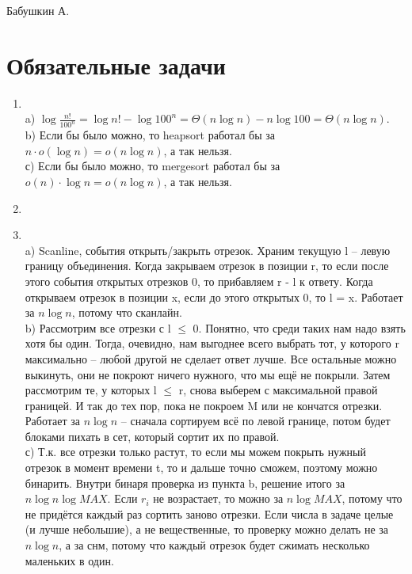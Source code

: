 \documentclass[12pt]{article}
\begin{document}
Бабушкин А.

\section{Обязательные задачи}

\begin{enumerate}
	\setlength{\parskip}{0pt} 
	\setlength{\itemsep}{0pt} 
	\item ~\\
	a) $\log{\frac{n!}{100^n}} = \log{n!} - \log{100^n} = \Theta(n\log n)  - n\log 100 = \Theta(n\log n)$. \\
	b) Если бы было можно, то heapsort работал бы за $n\cdot o(\log n) = o(n\log n)$, а так нельзя. \\
	с) Если бы было можно, то mergesort работал бы за $o(n)\cdot\log n = o(n\log n)$, а так нельзя. \\
	\item ~\\
	\item ~\\
	a) Scanline, события открыть/закрыть отрезок. Храним текущую l -- левую границу объединения. Когда закрываем отрезок в позиции r, то если после этого события открытых отрезков 0, то прибавляем r - l к ответу. Когда открываем отрезок в позиции x, если до этого открытых 0, то l = x. Работает за $n\log n$, потому что сканлайн.\\
	b) Рассмотрим все отрезки с l $\le$ 0. Понятно, что среди таких нам надо взять хотя бы один. Тогда, очевидно, нам выгоднее всего выбрать тот, у которого r максимально -- любой другой не сделает ответ лучше. Все остальные можно выкинуть, они не покроют ничего нужного, что мы ещё не покрыли. Затем рассмотрим те, у которых l $\le$ r, снова выберем с максимальной правой границей. И так до тех пор, пока не покроем M или не кончатся отрезки. Работает за $n\log n$ -- сначала сортируем всё по левой границе, потом будет блоками пихать в сет, который сортит их по правой. \\
	с) Т.к. все отрезки только растут, то если мы можем покрыть нужный отрезок в момент времени t, то и дальше точно сможем, поэтому можно бинарить. Внутри бинаря проверка из пункта b, решение итого за $n\log n\log MAX$. Если $r_i$ не возрастает, то можно за $n\log MAX$, потому что не придётся каждый раз сортить заново отрезки. Если числа в задаче целые (и лучше небольшие), а не вещественные, то проверку можно делать не за $n\log n$, а за снм, потому что каждый отрезок будет сжимать несколько маленьких в один. \\

\end{enumerate}
\end{document}
